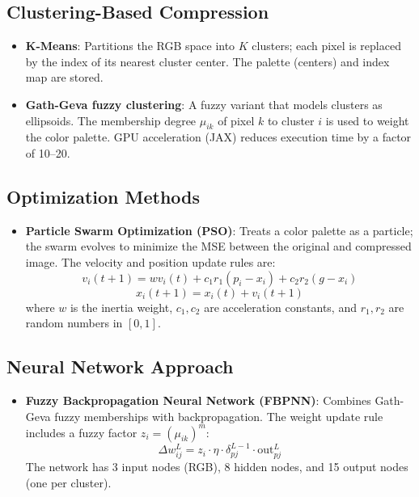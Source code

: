 \subsection{Clustering-Based Compression}

\begin{itemize}
    \item \textbf{K-Means}: Partitions the RGB space into \(K\) clusters; each pixel is replaced by the index of its nearest cluster center. The palette (centers) and index map are stored.
    
    \item \textbf{Gath-Geva fuzzy clustering}: A fuzzy variant that models clusters as ellipsoids. The membership degree \(\mu_{ik}\) of pixel \(k\) to cluster \(i\) is used to weight the color palette. GPU acceleration (JAX) reduces execution time by a factor of 10–20.
\end{itemize}

\subsection{Optimization Methods}

\begin{itemize}
    \item \textbf{Particle Swarm Optimization (PSO)}: Treats a color palette as a particle; the swarm evolves to minimize the MSE between the original and compressed image. The velocity and position update rules are:
    \[
    v_i(t+1) = w v_i(t) + c_1 r_1 (p_i - x_i) + c_2 r_2 (g - x_i)
    \]
    \[
    x_i(t+1) = x_i(t) + v_i(t+1)
    \]
    where \(w\) is the inertia weight, \(c_1, c_2\) are acceleration constants, and \(r_1, r_2\) are random numbers in \([0,1]\).
\end{itemize}

\subsection{Neural Network Approach}

\begin{itemize}
    \item \textbf{Fuzzy Backpropagation Neural Network (FBPNN)}: Combines Gath-Geva fuzzy memberships with backpropagation. The weight update rule includes a fuzzy factor \(z_i = (\mu_{ik})^m\):
    \[
    \Delta w_{ij}^L = z_i \cdot \eta \cdot \delta_{pj}^{L-1} \cdot \text{out}_{pj}^L
    \]
    The network has 3 input nodes (RGB), 8 hidden nodes, and 15 output nodes (one per cluster).
\end{itemize}

